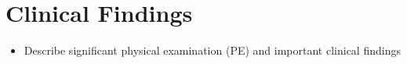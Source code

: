 \section{Clinical Findings}

\begin{itemize}
    \item Describe significant physical examination (PE) and important clinical findings
\end{itemize}
